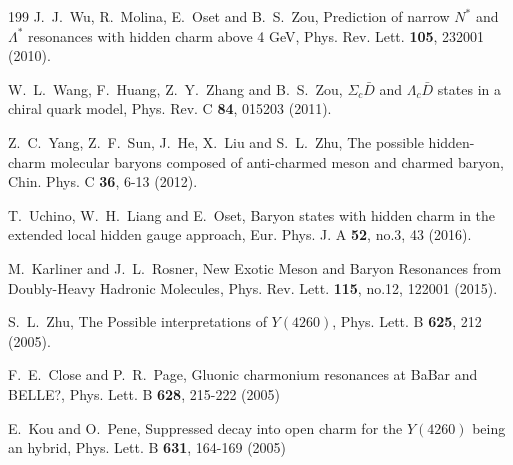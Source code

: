 \documentclass[final,5p,times,twocolumn]{elsarticle}
\begin{document}
\begin{thebibliography}{199}
J.~J.~Wu, R.~Molina, E.~Oset and B.~S.~Zou,
Prediction of narrow $N^*$ and $\Lambda^*$ resonances with hidden charm above 4 GeV,
Phys. Rev. Lett. \textbf{105}, 232001 (2010).


W.~L.~Wang, F.~Huang, Z.~Y.~Zhang and B.~S.~Zou,
$\Sigma_c \bar{D}$ and $\Lambda_c \bar{D}$ states in a chiral quark model,
Phys. Rev. C \textbf{84}, 015203 (2011).


Z.~C.~Yang, Z.~F.~Sun, J.~He, X.~Liu and S.~L.~Zhu,
The possible hidden-charm molecular baryons composed of anti-charmed meson and charmed baryon,
Chin. Phys. C \textbf{36}, 6-13 (2012).


T.~Uchino, W.~H.~Liang and E.~Oset,
Baryon states with hidden charm in the extended local hidden gauge approach,
Eur. Phys. J. A \textbf{52}, no.3, 43 (2016).


M.~Karliner and J.~L.~Rosner,
New Exotic Meson and Baryon Resonances from Doubly-Heavy Hadronic Molecules,
Phys. Rev. Lett. \textbf{115}, no.12, 122001 (2015).

S.~L.~Zhu,
The Possible interpretations of $Y(4260)$,
Phys. Lett. B \textbf{625}, 212 (2005).

F.~E.~Close and P.~R.~Page,
Gluonic charmonium resonances at BaBar and BELLE?,
Phys. Lett. B \textbf{628}, 215-222 (2005)

E.~Kou and O.~Pene,
Suppressed decay into open charm for the $Y(4260)$ being an hybrid,
Phys. Lett. B \textbf{631}, 164-169 (2005)



\end{thebibliography}
\end{document}
